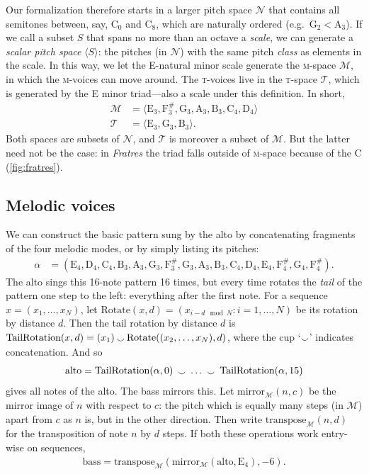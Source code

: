 \documentclass{interact}
\newcommand{\spn}[2]{\text{#1}_{#2}}
\newcommand\noteE{\spn E3}
\newcommand\noteF{\text{F}^\#_3}
\newcommand\noteG{\spn G3}
\newcommand\noteA{\spn A3}
\newcommand\noteB{\spn B3}
\newcommand\notec{\spn C4}
\newcommand\noted{\spn D4}
\newcommand\notee{\spn E4}
\newcommand\notef{\text{F}^\#_4}
\newcommand\noteg{\spn G4}
\newcommand{\MM}{\textsc{m}}
\newcommand{\TT}{\textsc{t}}
\newcommand*{\concat}{\mathbin{\raisebox{-.2em}{$\smallsmile$}}}
\begin{document}
Our formalization therefore starts in a larger pitch space $\mathcal N$ that contains all semitones between, say, $\spn{C}0$ and $\spn{C}8$, which are naturally ordered (e.g.~$\spn{G}{2} < \spn{A}{3}$).
If we call a subset $S$ that spans no more than an octave a \emph{scale}, we can generate a \emph{scalar pitch space} $\langle S \rangle$: the pitches (in $\mathcal N$) with the same pitch \emph{class} as elements in the scale.
In this way, we let the E-natural minor scale generate the \MM-space $\mathcal{M}$, in which the \MM-voices can move around.
The \TT-voices live in the \TT-space $\mathcal T$, which is generated by the E minor triad---also a scale under this definition.
In short,
\begin{align}
    \mathcal M &= \langle \noteE, \noteF, \noteG, \noteA, \noteB, \notec, \noted \rangle \\
    \mathcal T &= \langle \noteE, \noteG, \noteB \rangle.
\end{align}
Both spaces are subsets of $\mathcal N$, and $\mathcal T$ is moreover a subset of $\mathcal M$.
But the latter need not be the case: in \emph{Fratres} the triad falls outside of \MM-space because of the C\musNatural{} (\autoref{fig:fratres}).


\subsection{Melodic voices}

We can construct the basic pattern sung by the alto by concatenating fragments of the four melodic modes, or by simply listing its pitches:
\begin{align}
    \alpha 
        &= (\notee, \noted, \notec, \noteB, \noteA, 
        \noteG, \noteF, \noteG, 
        \noteA, \noteB, \notec, \noted, \notee, \notef,
        \noteg, \notef).
\end{align}
The alto sings this 16-note pattern 16 times, but every time rotates the \emph{tail} of the pattern one step to the left: everything after the first note.
For a sequence $x = (x_1, \dots, x_N)$, let $\text{Rotate}(x, d) = (x_{i - d \mod N}: i = 1, \dots, N)$ be its rotation by distance $d$. Then the tail rotation by distance $d$ is $\text{TailRotation}(x, d) = (x_1) \concat \text{Rotate}((x_2, \dots, x_N), d)$, where the cup `$\concat$' indicates concatenation. And so
\begin{align}
    \text{alto} = \text{TailRotation}(\alpha, 0) \; \concat \; \dots \; \concat \;  \text{TailRotation}(\alpha, 15)
\end{align}
gives all notes of the alto.
The bass mirrors this.
Let $\text{mirror}_\mathcal{M}(n, c)$ be the mirror image of $n$ with respect to $c$: the pitch which is equally many steps (in $\mathcal M$) apart from $c$ as $n$ is, but in the other direction.
Then write $\text{transpose}_\mathcal{M}(n, d)$ for the transposition of note $n$ by $d$ steps.
If both these operations work entry-wise on sequences,
\begin{align}
    \text{bass} = \text{transpose}_\mathcal{M}(\text{mirror}_\mathcal{M}(\text{alto}, \spn{E}{4}), -6).
\end{align}
\end{document}
